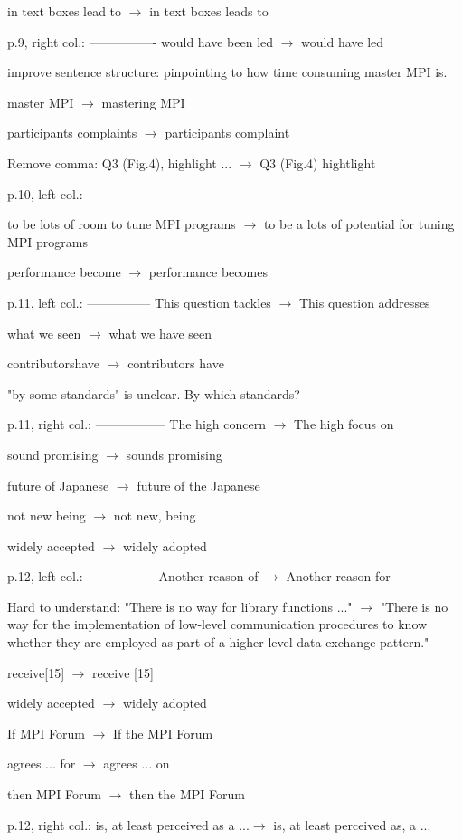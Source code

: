 \documentclass[11pt]{article}
\begin{document}
{in text boxes lead to $\to$ in text boxes leads to

p.9, right col.:
----------------
would have been led $\to$ would have led

improve sentence structure:
pinpointing to how time consuming master MPI is.

master MPI $\to$ mastering MPI

participants complaints $\to$ participants complaint

Remove comma:
Q3 (Fig.4), highlight ... $\to$ Q3 (Fig.4) hightlight

p.10, left col.:
---------------

to be lots of room to tune MPI programs $\to$
to be a lots of potential for tuning MPI programs

performance become $\to$ performance becomes

p.11, left col.:
---------------
This question tackles $\to$ This question addresses

what we seen $\to$ what we have seen

contributorshave $\to$ contributors have

"by some standards" is unclear. By which standards?

p.11, right col.:
-----------------
The high concern $\to$ The high focus on

sound promising $\to$ sounds promising

future of Japanese $\to$ future of the Japanese

not new being $\to$ not new, being

widely accepted $\to$ widely adopted

p.12, left col.:
----------------
Another reason of $\to$ Another reason for

Hard to understand:
"There is no way for library functions ..." $\to$
"There is no way for the implementation of low-level communication procedures
to know whether they are employed as part of a higher-level data exchange
pattern."

receive[15] $\to$ receive [15]

widely accepted $\to$ widely adopted

If MPI Forum $\to$ If the MPI Forum

agrees ... for $\to$ agrees ... on

then MPI Forum $\to$ then the MPI Forum

p.12, right col.:
is, at least perceived as a ...$\to$
is, at least perceived as, a ...
}
\end{document}
